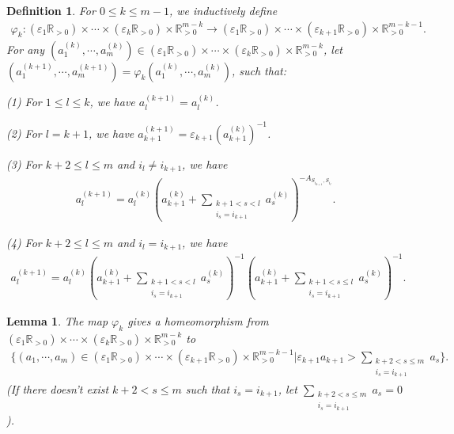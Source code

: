 \documentclass[12pt]{amsart}
\newtheorem{lemma}[theorem]{Lemma}
\newtheorem{definition}[theorem]{Definition}
\begin{document}
\begin{definition}
    For $0\leq k \leq m-1$, we inductively define 
\begin{align*}
    \varphi_k:(\varepsilon_1 \mathbb{R}_{>0})\times \cdots \times (\varepsilon_k \mathbb{R}_{>0}) \times  \mathbb{R}_{>0}^{m-k} \rightarrow (\varepsilon_1 \mathbb{R}_{>0})\times \cdots \times  (\varepsilon_{k+1} \mathbb{R}_{>0}) \times \mathbb{R}_{>0}^{m-k-1}.
\end{align*}
For any $(a_1^{(k)},\cdots,a_m^{(k)})\in (\varepsilon_1 \mathbb{R}_{>0})\times \cdots \times (\varepsilon_k \mathbb{R}_{>0}) \times  \mathbb{R}_{>0}^{m-k}$, let $(a_1^{(k+1)},\cdots,a_m^{(k+1)})=\varphi_k(a_1^{(k)},\cdots,a_m^{(k)})$, such that:

(1) For $1\leq l \leq k$, we have $a_l^{(k+1)}=a_l^{(k)}$.

(2) For $l=k+1$, we have $a_{k+1}^{(k+1)}=\varepsilon_{k+1}(a_{k+1}^{(k)})^{-1}$.

(3) For $k+2\leq l\leq m$ and $i_l\neq i_{k+1}$, we have 
\begin{align*}
    a_l^{(k+1)}=a_l^{(k)}( a_{k+1}^{(k)}+\sum_{\substack{k+1<s<l\\i_s=i_{k+1}}} a_s^{(k)} )^{-A_{S_{i_{k+1}},S_{i_l}}}.
\end{align*}

(4) For $k+2\leq l\leq m$ and $i_l= i_{k+1}$, we have 
\begin{align*}
    a_l^{(k+1)}=a_l^{(k)}( a_{k+1}^{(k)}+\sum_{\substack{k+1<s<l\\i_s=i_{k+1}}} a_s^{(k)} )^{-1} ( a_{k+1}^{(k)}+\sum_{\substack{k+1<s\leq l\\i_s=i_{k+1}}} a_s^{(k)} )^{-1}.
\end{align*}
\end{definition}


\begin{lemma}\label{varphikbij}
The map $\varphi_k$ gives a homeomorphism from $(\varepsilon_1 \mathbb{R}_{>0})\times \cdots \times (\varepsilon_k \mathbb{R}_{>0}) \times  \mathbb{R}_{>0}^{m-k}$ to 
\begin{align*}
    \{ (a_1,\cdots,a_m)\in (\varepsilon_1 \mathbb{R}_{>0})\times \cdots \times  (\varepsilon_{k+1} \mathbb{R}_{>0}) \times \mathbb{R}_{>0}^{m-k-1}| \varepsilon_{k+1}a_{k+1} > \sum_{\substack{k+2<s\leq m\\i_s=i_{k+1}}} a_s\}.
\end{align*}
 (If there doesn't exist $k+2 <s\leq m$ such that $i_s=i_{k+1}$, let $\sum_{\substack{k+2<s\leq m\\i_s=i_{k+1}}} a_s=0$).
\end{lemma}
\end{document}
